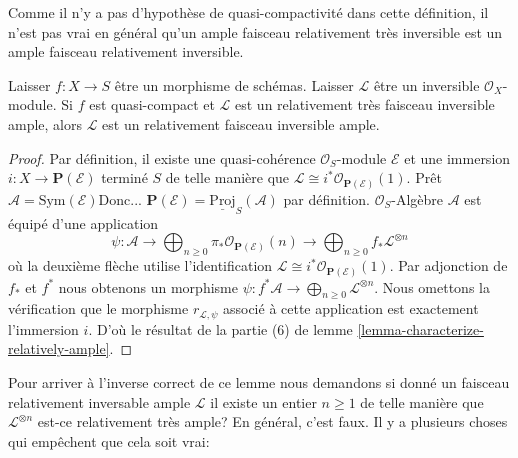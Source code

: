 \noindent
Comme il n'y a pas d'hypothèse de quasi-compactivité dans cette définition, il n'est pas vrai en général qu'un ample faisceau relativement très inversible est un ample faisceau relativement inversible.

\begin{lemma}

\label{lemma-ample-very-ample}

\begin{reference}
\cite[II, proposition 4.6.2]{EGA}
\end{reference}
Laisser $f : X \to S$ être un morphisme de schémas. Laisser $\mathcal{L}$ être un inversible $\mathcal{O}_X$-module. Si $f$ est quasi-compact et $\mathcal{L}$ est un relativement très faisceau inversible ample, alors $\mathcal{L}$ est un relativement faisceau inversible ample.
\end{lemma}

\begin{proof}

Par définition, il existe une quasi-cohérence $\mathcal{O}_S$-module
$\mathcal{E}$ et une immersion $i : X \to \mathbf{P}(\mathcal{E})$
terminé $S$ de telle manière que
$\mathcal{L} \cong i^*\mathcal{O}_{\mathbf{P}(\mathcal{E})}(1)$. Prêt $\mathcal{A} = \text{Sym}(\mathcal{E})$Donc...
$\mathbf{P}(\mathcal{E}) = \underline{\text{Proj}}_S(\mathcal{A})$
par définition. $\mathcal{O}_S$-Algèbre $\mathcal{A}$
est équipé d'une application
$$
\psi :
\mathcal{A} \to
\bigoplus\nolimits_{n \geq 0}
\pi_*\mathcal{O}_{\mathbf{P}(\mathcal{E})}(n) \to
\bigoplus\nolimits_{n \geq 0}
f_*\mathcal{L}^{\otimes n}
$$
où la deuxième flèche utilise l'identification
$\mathcal{L} \cong i^*\mathcal{O}_{\mathbf{P}(\mathcal{E})}(1)$. Par adjonction de $f_*$ et $f^*$ nous obtenons un morphisme
$\psi : f^*\mathcal{A} \to \bigoplus_{n \geq 0}\mathcal{L}^{\otimes n}$. Nous omettons la vérification que le morphisme $r_{\mathcal{L}, \psi}$
associé à cette application est exactement l'immersion $i$. D'où le résultat de la partie (6) de lemme \ref{lemma-characterize-relatively-ample}.

\end{proof}

\noindent

Pour arriver à l'inverse correct de ce lemme nous demandons si donné un faisceau relativement inversable ample $\mathcal{L}$ il existe un entier $n \geq 1$ de telle manière que $\mathcal{L}^{\otimes n}$ est-ce relativement très ample? En général, c'est faux. Il y a plusieurs choses qui empêchent que cela soit vrai:

